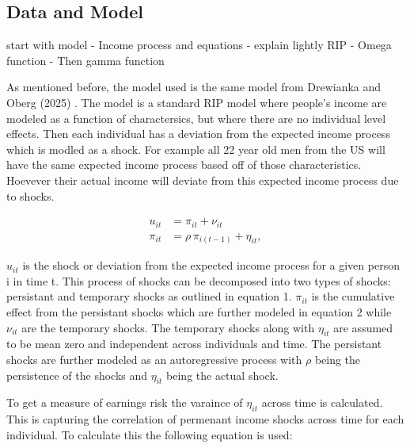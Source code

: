\documentclass[12pt]{article}
\begin{document}
\begin{onehalfspace}



\section{Data and Model}




start with model
- Income process and equations 
- explain lightly RIP
- Omega function 
- Then gamma function





As mentioned before, the model used is the same model from Drewianka and Oberg (2025) \cite{drewianka2025}. The model is a standard RIP model where people's income are modeled as a function of charactersics, but where there are no individual level effects. Then each individual has a deviation from the expected income process which is modled as a shock. For example all 22 year old men from the US will have the same expected income process based off of those characteristics. Hoevever their actual income will deviate from this expected income process due to shocks. 



\begin{align}
u_{it} 
&= \pi_{it} + \nu_{it} \\[1ex]
\pi_{it} 
&= \rho\,\pi_{i(t-1)} + \eta_{it},
\end{align}


$u_{it}$ is the shock or deviation from the expected income process for a given person i in time t. This process of shocks can be decomposed into two types of shocks: persistant and temporary shocks as outlined in equation 1. $\pi_{it}$ is the cumulative effect from the persistant shocks which are further modeled in equation 2 while $\nu_{it}$ are the temporary shocks. The temporary shocks along with $\eta_{it}$ are assumed to be mean zero and independent across individuals and time. The persistant shocks are further modeled as an autoregressive process with $\rho$ being the persistence of the shocks and $\eta_{it}$ being the actual shock.



To get a measure of earnings risk the varaince of $\eta_{it}$ across time is calculated. This is capturing the correlation of permenant income shocks across time for each individual. To calculate this the following equation is used:




\end{onehalfspace}
\end{document}
